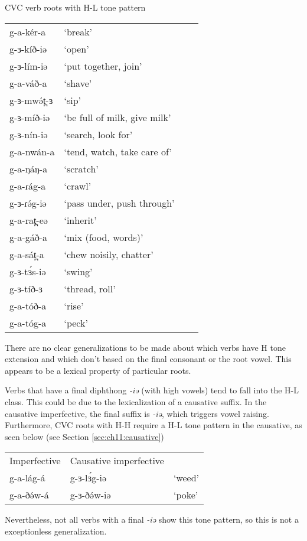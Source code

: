 \ea CVC verb roots with H-L tone pattern
\begin{tabular}[t]{llll}
g-a-kér-a	&	‘break’\\
g-ɜ-kíð-iə	&	‘open’\\
g-ɜ-lím-iə	&	‘put together, join’\\
g-a-váð-a 	&	‘shave’\\
g-ɜ-mwə́t̪-ɜ	&	‘sip’\\
g-ɜ-míð-iə	&	‘be full of milk, give milk’\\
g-ɜ-nín-iə	&	‘search, look for’\\
g-a-nwán-a	&	‘tend, watch, take care of’\\
g-a-ŋáŋ-a	&	‘scratch’\\
g-a-ɾág-a	&	‘crawl’\\
g-ɜ-ɾə́g-iə	&	‘pass under, push through’\\
g-a-rat̪-eə	&	‘inherit’\\
g-a-gáð-a	&	‘mix (food, words)’\\
g-a-sát̪-a	&	‘chew noisily, chatter’\\
g-ɜ-tɜ́s-iə	&	‘swing’\\
g-ɜ-tíð-ɜ	&	‘thread, roll’\\
g-a-tóð-a	&	‘rise'\\
g-a-tóg-a	&	‘peck’\\
\end{tabular}
\z 
There are no clear generalizations to be made about which verbs have H tone extension and which don’t based on the final consonant or the root vowel. This appears to be a lexical property of particular roots. 

Verbs that have a final diphthong \textit{-iə} (with high vowels) tend to fall into the H-L class. This could be due to the lexicalization of a causative suffix. In the causative imperfective, the final suffix is \textit{-iə}, which triggers vowel raising. Furthermore, CVC roots with H-H require a H-L tone pattern in the causative, as seen below (see Section \ref{sec:ch11:causative}) 

\ea 	
\begin{tabular}[t]{lll}
Imperfective	&	Causative imperfective	 \\ 
g-a-lág-á	&	g-ɜ-lɜ́g-iə	&	‘weed’\\
g-a-ðə́w-á	&	g-ɜ-ðə́w-iə	&	‘poke’ \\	
\end{tabular}
\z 
Nevertheless, not all verbs with a final \textit{-iə} show this tone pattern, so this is not a exceptionless generalization. 


